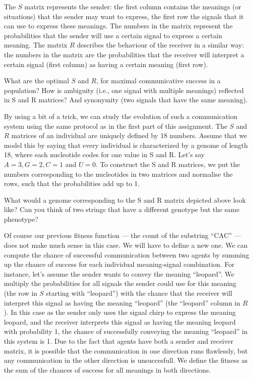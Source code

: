 \documentclass[a4paper, 9pt]{article}
\begin{document}
The $S$ matrix represents the sender: the first column contains the
meanings (or situations) that the sender may want to express, the first
row the signals that it can use to express these meanings. The numbers
in the matrix represent the probabilities that the sender will use a
certain signal to express a certain meaning. The matrix $R$ describes
the behaviour of the receiver in a similar way: the numbers in the
matrix are the probabilities that the receiver will interpret a certain
signal (first column) as having a certain meaning (first row).

\begin{exercise}
\askstar What are the optimal $S$ and $R$, for maximal communicative success in a population?
\askstar How is ambiguity (i.e., one signal with multiple meanings) reflected in S and R matrices? And synonymity (two signals that have the same meaning).
\end{exercise}

By using a bit of a trick, we can study the evolution of such a
communication system using the same protocol as in the first part of
this assignment. The $S$ and $R$ matrices of an individual are uniquely
defined by 18 numbers. Assume that we model this by saying that every
individual is characterized by a genome of length 18, where each
nucleotide codes for one value in S and R. Let's say $A=3, G=2, C=1$ and
$U=0$. To construct the S and R matrices, we put the numbers corresponding
to the nucleotides in two matrices and normalise the rows, such that the
probabilities add up to 1.

\begin{exercise}
\ask What would a genome corresponding to the S and R matrix depicted above look like?
\ask Can you think of two strings that have a different genotype but the same phenotype?
\end{exercise}

Of course our previous fitness function --- the count of the substring
``CAC'' --- does not make much sense in this case. We will have to define
a new one. We can compute the chance of successful communication between
two agents by summing up the chance of success for each individual
meaning-signal combination. For instance, let's assume the sender wants
to convey the meaning ``leopard''. We multiply the probabilities for all
signals the sender could use for this meaning (the row in $S$ starting
with ``leopard'') with the chance that the receiver will interpret this
signal as having the meaning ``leopard'' (the ``leopard'' column in
$R$). In this case as the sender only uses the signal chirp to express
the meaning leopard, and the receiver interprets this signal as having
the meaning leopard with probability 1, the chance of successfully
conveying the meaning ``leopard'' in this system is 1. Due to the fact
that agents have both a sender and receiver matrix, it is possible that
the communication in one direction runs flawlessly, but any
communication in the other direction is unsuccesfull. We define the
fitness as the sum of the chances of success for all meanings in both
directions.
\end{document}
